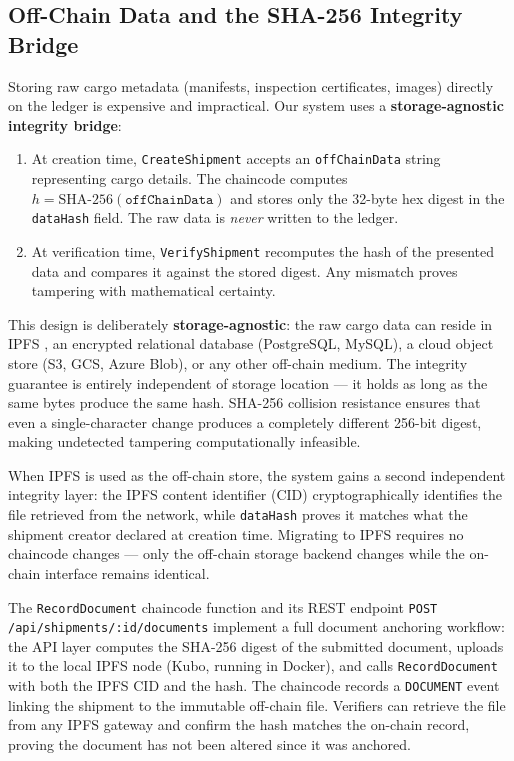 \documentclass[conference]{IEEEtran}
\begin{document}
\subsection{Off-Chain Data and the SHA-256 Integrity Bridge}
\label{sec:offchain}

Storing raw cargo metadata (manifests, inspection certificates, images)
directly on the ledger is expensive and impractical.  Our system uses a
\textbf{storage-agnostic integrity bridge}:

\begin{enumerate}
  \item At creation time, \texttt{CreateShipment} accepts an
    \texttt{offChainData} string representing cargo details.  The chaincode
    computes $h = \text{SHA-256}(\texttt{offChainData})$ and stores only the
    32-byte hex digest in the \texttt{dataHash} field.  The raw data is
    \emph{never} written to the ledger.
  \item At verification time, \texttt{VerifyShipment} recomputes the hash of
    the presented data and compares it against the stored digest.  Any
    mismatch proves tampering with mathematical certainty.
\end{enumerate}

This design is deliberately \textbf{storage-agnostic}: the raw cargo data
can reside in IPFS \cite{ipfs}, an encrypted relational database (PostgreSQL,
MySQL), a cloud object store (S3, GCS, Azure Blob), or any other off-chain
medium.  The integrity guarantee is entirely independent of storage location
--- it holds as long as the same bytes produce the same hash.  SHA-256
collision resistance ensures that even a single-character change produces a
completely different 256-bit digest, making undetected tampering
computationally infeasible.

When IPFS is used as the off-chain store, the system gains a second
independent integrity layer: the IPFS content identifier (CID) cryptographically
identifies the file retrieved from the network, while \texttt{dataHash}
proves it matches what the shipment creator declared at creation time.
Migrating to IPFS requires no chaincode changes --- only the off-chain
storage backend changes while the on-chain interface remains identical.

The \texttt{RecordDocument} chaincode function and its REST endpoint
\texttt{POST /api/shipments/:id/documents} implement a full document
anchoring workflow: the API layer computes the SHA-256 digest of the
submitted document, uploads it to the local IPFS node (Kubo, running in
Docker), and calls \texttt{RecordDocument} with both the IPFS CID and the
hash.  The chaincode records a \texttt{DOCUMENT} event linking the shipment
to the immutable off-chain file.  Verifiers can retrieve the file from any
IPFS gateway and confirm the hash matches the on-chain record, proving
the document has not been altered since it was anchored.
\end{document}
